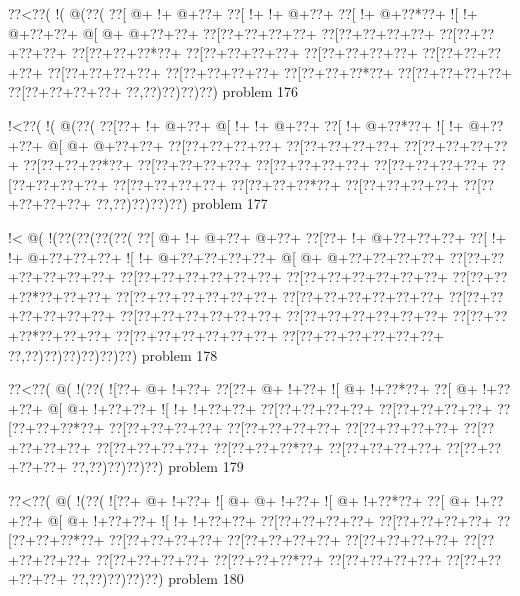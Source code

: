 \vbox{\vbox{\goo
\0??<\0??(\- !(\- @(\0??(
\0??[\- @+\- !+\- @+\0??+
\0??[\- !+\- !+\- @+\0??+
\0??[\- !+\- @+\0??*\0??+
\- ![\- !+\- @+\0??+\0??+
\- @[\- @+\- @+\0??+\0??+
\0??[\0??+\0??+\0??+\0??+
\0??[\0??+\0??+\0??+\0??+
\0??[\0??+\0??+\0??+\0??+
\0??[\0??+\0??+\0??*\0??+
\0??[\0??+\0??+\0??+\0??+
\0??[\0??+\0??+\0??+\0??+
\0??[\0??+\0??+\0??+\0??+
\0??[\0??+\0??+\0??+\0??+
\0??[\0??+\0??+\0??+\0??+
\0??[\0??+\0??+\0??*\0??+
\0??[\0??+\0??+\0??+\0??+
\0??[\0??+\0??+\0??+\0??+
\0??,\0??)\0??)\0??)\0??)
}
\hfil problem 176\hfil\break
}

\vbox{\vbox{\goo
\- !<\0??(\- !(\- @(\0??(
\0??[\0??+\- !+\- @+\0??+
\- @[\- !+\- !+\- @+\0??+
\0??[\- !+\- @+\0??*\0??+
\- ![\- !+\- @+\0??+\0??+
\- @[\- @+\- @+\0??+\0??+
\0??[\0??+\0??+\0??+\0??+
\0??[\0??+\0??+\0??+\0??+
\0??[\0??+\0??+\0??+\0??+
\0??[\0??+\0??+\0??*\0??+
\0??[\0??+\0??+\0??+\0??+
\0??[\0??+\0??+\0??+\0??+
\0??[\0??+\0??+\0??+\0??+
\0??[\0??+\0??+\0??+\0??+
\0??[\0??+\0??+\0??+\0??+
\0??[\0??+\0??+\0??*\0??+
\0??[\0??+\0??+\0??+\0??+
\0??[\0??+\0??+\0??+\0??+
\0??,\0??)\0??)\0??)\0??)
}
\hfil problem 177\hfil\break
}

\vbox{\vbox{\goo
\- !<\- @(\- !(\0??(\0??(\0??(\0??(
\0??[\- @+\- !+\- @+\0??+\- @+\0??+
\0??[\0??+\- !+\- @+\0??+\0??+\0??+
\0??[\- !+\- !+\- @+\0??+\0??+\0??+
\- ![\- !+\- @+\0??+\0??+\0??+\0??+
\- @[\- @+\- @+\0??+\0??+\0??+\0??+
\0??[\0??+\0??+\0??+\0??+\0??+\0??+
\0??[\0??+\0??+\0??+\0??+\0??+\0??+
\0??[\0??+\0??+\0??+\0??+\0??+\0??+
\0??[\0??+\0??+\0??*\0??+\0??+\0??+
\0??[\0??+\0??+\0??+\0??+\0??+\0??+
\0??[\0??+\0??+\0??+\0??+\0??+\0??+
\0??[\0??+\0??+\0??+\0??+\0??+\0??+
\0??[\0??+\0??+\0??+\0??+\0??+\0??+
\0??[\0??+\0??+\0??+\0??+\0??+\0??+
\0??[\0??+\0??+\0??*\0??+\0??+\0??+
\0??[\0??+\0??+\0??+\0??+\0??+\0??+
\0??[\0??+\0??+\0??+\0??+\0??+\0??+
\0??,\0??)\0??)\0??)\0??)\0??)\0??)
}
\hfil problem 178\hfil\break
}

\vbox{\vbox{\goo
\0??<\0??(\- @(\- !(\0??(
\- ![\0??+\- @+\- !+\0??+
\0??[\0??+\- @+\- !+\0??+
\- ![\- @+\- !+\0??*\0??+
\0??[\- @+\- !+\0??+\0??+
\- @[\- @+\- !+\0??+\0??+
\- ![\- !+\- !+\0??+\0??+
\0??[\0??+\0??+\0??+\0??+
\0??[\0??+\0??+\0??+\0??+
\0??[\0??+\0??+\0??*\0??+
\0??[\0??+\0??+\0??+\0??+
\0??[\0??+\0??+\0??+\0??+
\0??[\0??+\0??+\0??+\0??+
\0??[\0??+\0??+\0??+\0??+
\0??[\0??+\0??+\0??+\0??+
\0??[\0??+\0??+\0??*\0??+
\0??[\0??+\0??+\0??+\0??+
\0??[\0??+\0??+\0??+\0??+
\0??,\0??)\0??)\0??)\0??)
}
\hfil problem 179\hfil\break
}

\vbox{\vbox{\goo
\0??<\0??(\- @(\- !(\0??(
\- ![\0??+\- @+\- !+\0??+
\- ![\- @+\- @+\- !+\0??+
\- ![\- @+\- !+\0??*\0??+
\0??[\- @+\- !+\0??+\0??+
\- @[\- @+\- !+\0??+\0??+
\- ![\- !+\- !+\0??+\0??+
\0??[\0??+\0??+\0??+\0??+
\0??[\0??+\0??+\0??+\0??+
\0??[\0??+\0??+\0??*\0??+
\0??[\0??+\0??+\0??+\0??+
\0??[\0??+\0??+\0??+\0??+
\0??[\0??+\0??+\0??+\0??+
\0??[\0??+\0??+\0??+\0??+
\0??[\0??+\0??+\0??+\0??+
\0??[\0??+\0??+\0??*\0??+
\0??[\0??+\0??+\0??+\0??+
\0??[\0??+\0??+\0??+\0??+
\0??,\0??)\0??)\0??)\0??)
}
\hfil problem 180\hfil\break
}

